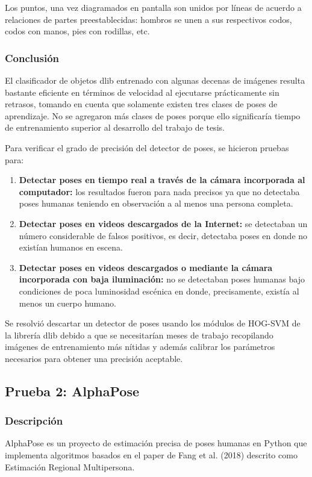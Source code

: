 \documentclass[a4paper,12pt,oneside,spanish]{book}
\begin{document}
Los puntos, una vez diagramados en pantalla son unidos por líneas de acuerdo a relaciones de partes preestablecidas: hombros se unen a sus respectivos codos, codos con manos, pies con rodillas, etc.\par

\subsubsection{Conclusión}
El clasificador de objetos dlib entrenado con algunas decenas de imágenes resulta bastante eficiente en términos de velocidad al ejecutarse prácticamente sin retrasos, tomando en cuenta que solamente existen tres clases de poses de aprendizaje. No se agregaron más clases de poses porque ello significaría tiempo de entrenamiento superior al desarrollo del trabajo de tesis.\par

Para verificar el grado de precisión del detector de poses, se hicieron pruebas para:
 \begin{enumerate}
 	\item \textbf{Detectar poses en tiempo real a través de la cámara incorporada al computador:} los resultados fueron para nada precisos ya que no detectaba poses humanas teniendo en observación a al menos una persona completa.
 	\item \textbf{Detectar poses en videos descargados de la Internet:} se detectaban un número considerable de falsos positivos, es decir, detectaba poses en donde no existían  humanos en escena.
	\item \textbf{Detectar poses en videos descargados o mediante la cámara incorporada con baja iluminación:} no se detectaban poses humanas bajo condiciones de poca luminosidad escénica en donde, precisamente, existía al menos un cuerpo humano.
\end{enumerate}

Se resolvió descartar un detector de poses usando los módulos de HOG-SVM de la librería dlib debido a que se necesitarían meses de trabajo recopilando imágenes de entrenamiento más nítidas y además calibrar los parámetros necesarios para obtener una precisión aceptable.\par

\subsection{Prueba 2: AlphaPose}
\subsubsection{Descripción}
AlphaPose es un proyecto de estimación precisa de poses humanas en Python que implementa algoritmos basados en el paper de Fang et al. (2018) \cite{alphapose1} descrito como Estimación Regional Multipersona.\par
\end{document}
